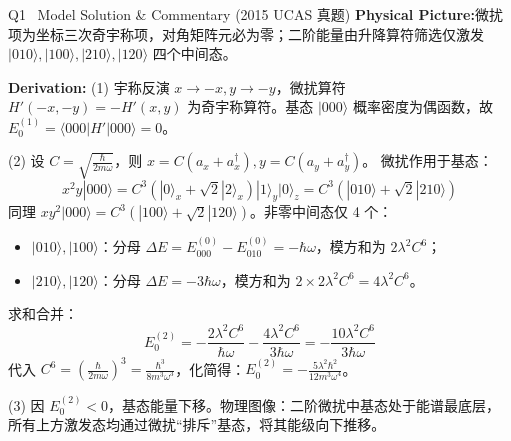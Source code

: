 \documentclass[a4paper,11pt]{article}
\begin{document}
\begin{solution}{Q1 \textperiodcentered\ Model Solution \& Commentary (2015 UCAS 真题)}
\textbf{Physical Picture:}\enspace 微扰项为坐标三次奇宇称项，对角矩阵元必为零；二阶能量由升降算符筛选仅激发 $|010\rangle, |100\rangle, |210\rangle, |120\rangle$ 四个中间态。

\vspace{1.5mm}
\textbf{Derivation:}\enspace
(1) 宇称反演 $x \to -x, y \to -y$，微扰算符 $H'(-x,-y) = -H'(x,y)$ 为奇宇称算符。基态 $|000\rangle$ 概率密度为偶函数，故 $E_0^{(1)} = \langle 000|H'|000\rangle = 0$。

(2) 设 $C = \sqrt{\frac{\hbar}{2m\omega}}$，则 $x = C(a_x+a_x^\dagger), y = C(a_y+a_y^\dagger)$。
微扰作用于基态：
\[
  x^2 y |000\rangle = C^3 (|0\rangle_x + \sqrt{2}|2\rangle_x)|1\rangle_y |0\rangle_z = C^3 (|010\rangle + \sqrt{2}|210\rangle)
\]
同理 $x y^2 |000\rangle = C^3 (|100\rangle + \sqrt{2}|120\rangle)$。非零中间态仅 4 个：
\begin{itemize}[leftmargin=1.5em, itemsep=1pt, topsep=1pt]
  \item $|010\rangle, |100\rangle$：分母 $\Delta E = E_{000}^{(0)} - E_{010}^{(0)} = -\hbar\omega$，模方和为 $2 \lambda^2 C^6$；
  \item $|210\rangle, |120\rangle$：分母 $\Delta E = -3\hbar\omega$，模方和为 $2 \times 2\lambda^2 C^6 = 4\lambda^2 C^6$。
\end{itemize}
求和合并：
\[
  E_0^{(2)} = -\frac{2\lambda^2 C^6}{\hbar\omega} - \frac{4\lambda^2 C^6}{3\hbar\omega} = -\frac{10\lambda^2 C^6}{3\hbar\omega}
\]
代入 $C^6 = \left(\frac{\hbar}{2m\omega}\right)^3 = \frac{\hbar^3}{8m^3\omega^3}$，化简得：$E_0^{(2)} = -\frac{5\lambda^2 \hbar^2}{12 m^3 \omega^4}$。

(3) 因 $E_0^{(2)} < 0$，基态能量下移。物理图像：二阶微扰中基态处于能谱最底层，所有上方激发态均通过微扰“排斥”基态，将其能级向下推移。
\end{solution}

\vspace{4pt}
\end{document}
